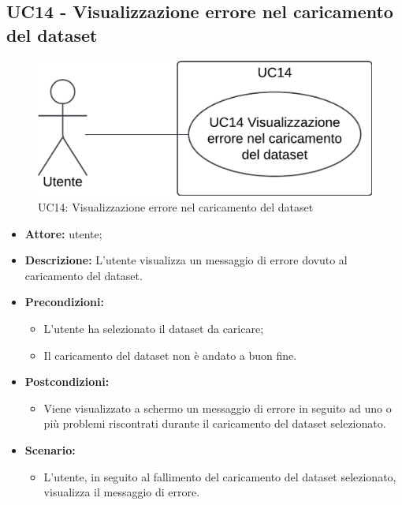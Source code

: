 \pagebreak

\subsection{UC14 - Visualizzazione errore nel caricamento del dataset}
\begin{figure}[h!]\centering
    \includegraphics[scale=0.7]{template/images/UC14.png}
    \caption{UC14: Visualizzazione errore nel caricamento del dataset}
\end{figure}
\begin{itemize}    
    \item \textbf{Attore:} utente;
    \item \textbf{Descrizione:} L'utente visualizza un messaggio di errore dovuto al caricamento del dataset.
    \item \textbf{Precondizioni:}    
        \begin{itemize}
            \item L'utente ha selezionato il dataset da caricare;
            \item Il caricamento del dataset non è andato a buon fine.
        \end{itemize}    
    \item \textbf{Postcondizioni:}
        \begin{itemize}
            \item Viene visualizzato a schermo un messaggio di errore in seguito ad uno o più problemi riscontrati durante il caricamento del dataset selezionato.
        \end{itemize}    
    \item \textbf{Scenario:} 
        \begin{itemize}
            \item L'utente, in seguito al fallimento del caricamento del dataset selezionato, visualizza il messaggio di errore.
        \end{itemize}
\end{itemize}
